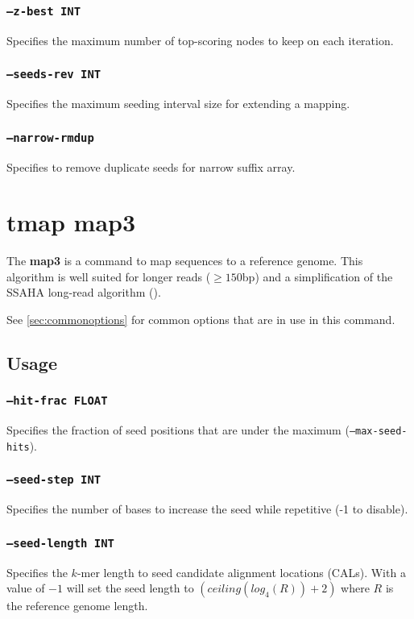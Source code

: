 \documentclass[a4paper,12pt]{book}
\newcommand{\TT}[1]{{\tt #1}} %
\newcommand{\BF}[1]{{\bf #1}} %
\begin{document}
\subsubsection{\TT{--z-best INT}}
Specifies the maximum number of top-scoring nodes to keep on each iteration.

\subsubsection{\TT{--seeds-rev INT}}
Specifies the maximum seeding interval size for extending a mapping.

\subsubsection{\TT{--narrow-rmdup}}
Specifies to remove duplicate seeds for narrow suffix array.

\section{tmap map3}
\label{sec:map3}
The \BF{map3} is a command to map sequences to a reference genome.
This algorithm is well suited for longer reads ($\geq 150$bp) and a simplification of the SSAHA long-read algorithm (\cite{SSAHA}).

See \autoref{sec:commonoptions} for common options that are in use in this command.

\subsection{Usage}

\subsubsection{\TT{--hit-frac FLOAT}}
Specifies the fraction of seed positions that are under the maximum (\TT{--max-seed-hits}).

\subsubsection{\TT{--seed-step INT}}
Specifies the number of bases to increase the seed while repetitive (-1 to disable).


\subsubsection{\TT{--seed-length INT}}
Specifies the $k$-mer length to seed candidate alignment locations (CALs).
With a value of $-1$ will set the seed length to $\left(ceiling(log_4(R)) + 2\right)$ where $R$ is the reference genome length.
\end{document}
